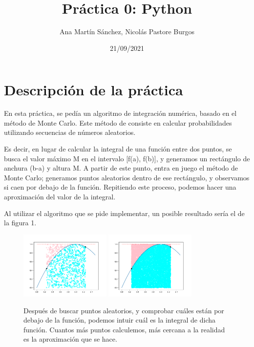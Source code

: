 \documentclass[11pt]{article}
\title{Práctica 0: Python}
\author{Ana Martín Sánchez, Nicolás Pastore Burgos}
\date{21/09/2021}
\begin{document}
\maketitle

\section{Descripción de la práctica}

 En esta práctica, se pedía un algoritmo de integración numérica, basado en el método de Monte Carlo. Este método de consiste en calcular probabilidades utilizando secuencias de números aleatorios. 

 Es decir, en lugar de calcular la integral de una función entre dos puntos, se busca el valor máximo M en el intervalo [f(a), f(b)], y generamos un rectángulo de anchura (b-a) y altura M. A partir de este punto, entra en juego el método de Monte Carlo; generamos puntos aleatorios dentro de ese rectángulo, y observamos si caen por debajo de la función. Repitiendo este proceso, podemos hacer una aproximación del valor de la integral.

 Al utilizar el algoritmo que se pide implementar, un posible resultado sería el de la figura 1.
 
 \begin{figure}[h!]
    \begin{center}
    \includegraphics[width=0.4\textwidth]{EjemploMonteCarlo.png}
    \includegraphics[width=0.4\textwidth]{EjemploMonteCarlo2.png}
    \caption{Después de buscar puntos aleatorios, y comprobar cuáles están por debajo de la función, podemos intuir cuál es la integral de dicha función. Cuantos más puntos calculemos, más cercana a la realidad es la aproximación que se hace.}
    \label{fig:EjemploMonteCarlo}
    \end{center}
 \end{figure}
\end{document}
